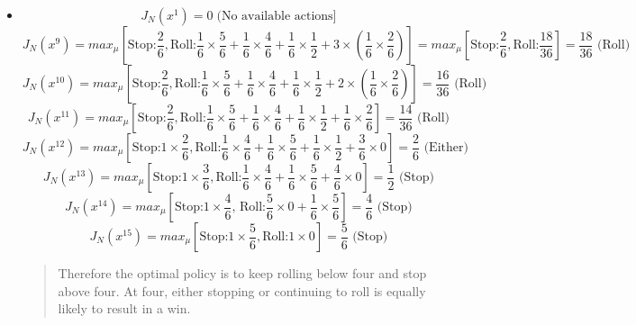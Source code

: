 \documentclass[11pt]{article}
\newenvironment{problem}[2][Problem]{\begin{trivlist}
\item[\hskip \labelsep {\bfseries #1}\hskip \labelsep {\bfseries #2.}]}{\end{trivlist}}
\begin{document}
\begin{problem}{4}
\begin{itemize}
		
		\item[Roll 1]	
		\begin{equation}
			J_N(x^1) = 0 \; \text{(No available actions]}
		\end{equation}
		\begin{equation}
			J_N(x^{9}) = max_{\mu} \left[ \text{Stop:} \frac{2}{6}, \text{Roll:} \frac{1}{6} \times \frac{5}{6} + \frac{1}{6} \times \frac{4}{6} + \frac{1}{6} \times \frac{1}{2} + 3 \times (\frac{1}{6} \times \frac{2}{6})\right] = max_{\mu} \left[ \text{Stop:} \frac{2}{6}, \text{Roll:} \frac{18}{36}\right] = \frac{18}{36} \text{ (Roll)}
		\end{equation}
		\begin{equation}
			J_N(x^{10}) = max_{\mu} \left[ \text{Stop:} \frac{2}{6}, \text{Roll:} \frac{1}{6} \times \frac{5}{6} + \frac{1}{6} \times \frac{4}{6} + \frac{1}{6} \times \frac{1}{2} + 2 \times (\frac{1}{6} \times \frac{2}{6})\right] = \frac{16}{36} \text{ (Roll)}
		\end{equation}
		\begin{equation}
			J_N(x^{11}) = max_{\mu} \left[ \text{Stop:} \frac{2}{6}, \text{Roll:} \frac{1}{6} \times \frac{5}{6} + \frac{1}{6} \times \frac{4}{6} + \frac{1}{6} \times \frac{1}{2} + \frac{1}{6} \times \frac{2}{6}\right] = \frac{14}{36} \text{ (Roll)}
		\end{equation}
		\begin{equation}
			J_N(x^{12}) = max_{\mu} \left[ \text{Stop:} 1 \times \frac{2}{6}, \text{Roll:} \frac{1}{6} \times \frac{4}{6} + \frac{1}{6} \times \frac{5}{6} + \frac{1}{6} \times \frac{1}{2} + \frac{3}{6} \times 0 \right] = \frac{2}{6} \text{ (Either)}
		\end{equation}
		\begin{equation}
			J_N(x^{13}) = max_{\mu} \left[ \text{Stop:} 1 \times \frac{3}{6}, \text{Roll:} \frac{1}{6} \times \frac{4}{6} + \frac{1}{6} \times \frac{5}{6} + \frac{4}{6} \times 0 \right] = \frac{1}{2} \text{ (Stop)}
		\end{equation}
		\begin{equation}
			J_N(x^{14}) = max_{\mu} \left[ \text{Stop:} 1 \times \frac{4}{6} \text{, Roll:} \frac{5}{6} \times 0 + \frac{1}{6} \times \frac{5}{6}\right] = \frac{4}{6} \text{ (Stop)}
		\end{equation}
		\begin{equation}
			J_N(x^{15}) = max_{\mu} \left[ \text{Stop:} 1 \times \frac{5}{6}, \text{Roll:} 1 \times 0 \right] = \frac{5}{6} \text{ (Stop)}
		\end{equation}
		
		
		\begin{verse}
			Therefore the optimal policy is to keep rolling below four and stop above four. At four, either stopping or continuing to roll is equally likely to result in a win.
		\end{verse}				
		
	\end{itemize}
\end{problem}
\end{document}
